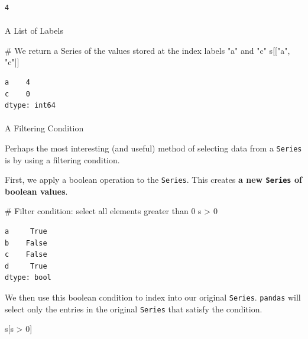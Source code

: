 \documentclass[
  letterpaper,
  DIV=11,
  numbers=noendperiod]{scrreprt}
\makeatletter
\let\oldparagraph\paragraph
\renewcommand{\paragraph}{
    \@ifstar
      \xxxParagraphStar
      \xxxParagraphNoStar
  }
\newcommand{\xxxParagraphStar}[1]{\oldparagraph*{#1}\mbox{}}
\newcommand{\xxxParagraphNoStar}[1]{\oldparagraph{#1}\mbox{}}
\newenvironment{Shaded}{\begin{snugshade}}{\end{snugshade}}
\newcommand{\CommentTok}[1]{\textcolor[rgb]{0.37,0.37,0.37}{#1}}
\newcommand{\DecValTok}[1]{\textcolor[rgb]{0.68,0.00,0.00}{#1}}
\newcommand{\NormalTok}[1]{\textcolor[rgb]{0.00,0.23,0.31}{#1}}
\newcommand{\OperatorTok}[1]{\textcolor[rgb]{0.37,0.37,0.37}{#1}}
\newcommand{\StringTok}[1]{\textcolor[rgb]{0.13,0.47,0.30}{#1}}
\makeatother
\begin{document}
\begin{verbatim}
4
\end{verbatim}

\paragraph{A List of Labels}\label{a-list-of-labels}

\begin{Shaded}
\begin{Highlighting}[]
\CommentTok{\# We return a Series of the values stored at the index labels "a" and "c"}
\NormalTok{s[[}\StringTok{"a"}\NormalTok{, }\StringTok{"c"}\NormalTok{]] }
\end{Highlighting}
\end{Shaded}

\begin{verbatim}
a    4
c    0
dtype: int64
\end{verbatim}

\paragraph{A Filtering Condition}\label{a-filtering-condition}

Perhaps the most interesting (and useful) method of selecting data from
a \texttt{Series} is by using a filtering condition.

First, we apply a boolean operation to the \texttt{Series}. This creates
\textbf{a new \texttt{Series} of boolean values}.

\begin{Shaded}
\begin{Highlighting}[]
\CommentTok{\# Filter condition: select all elements greater than 0}
\NormalTok{s }\OperatorTok{\textgreater{}} \DecValTok{0} 
\end{Highlighting}
\end{Shaded}

\begin{verbatim}
a     True
b    False
c    False
d     True
dtype: bool
\end{verbatim}

We then use this boolean condition to index into our original
\texttt{Series}. \texttt{pandas} will select only the entries in the
original \texttt{Series} that satisfy the condition.

\begin{Shaded}
\begin{Highlighting}[]
\NormalTok{s[s }\OperatorTok{\textgreater{}} \DecValTok{0}\NormalTok{] }
\end{Highlighting}
\end{Shaded}
\end{document}
